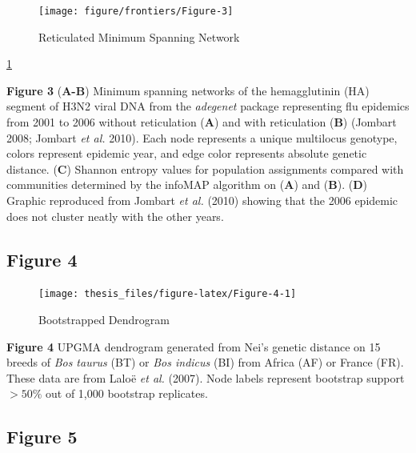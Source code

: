 \documentclass[double,12pt]{beavtex}
\begin{document}
  \begin{figure}
  
  {\centering \texttt{[image: figure/frontiers/Figure-3]} 
  
  }
  
  \caption[Reticulated Minimum Spanning Network]{Reticulated Minimum Spanning Network}\label{fig:Figure-3}
  \end{figure}
  
  \ref{fig:Figure-3}
  
  \textbf{Figure 3} (\textbf{A-B}) Minimum spanning networks of the
  hemagglutinin (HA) segment of H3N2 viral DNA from the \emph{adegenet}
  package representing flu epidemics from 2001 to 2006 without
  reticulation (\textbf{A}) and with reticulation (\textbf{B}) (Jombart
  2008; Jombart \emph{et al.} 2010). Each node represents a unique
  multilocus genotype, colors represent epidemic year, and edge color
  represents absolute genetic distance. (\textbf{C}) Shannon entropy
  values for population assignments compared with communities determined
  by the infoMAP algorithm on (\textbf{A}) and (\textbf{B}). (\textbf{D})
  Graphic reproduced from Jombart \emph{et al.} (2010) showing that the
  2006 epidemic does not cluster neatly with the other years.
  
  \newpage
  
  \subsection{Figure 4}\label{figure-4}
  
  \begin{figure}
  
  {\centering \texttt{[image: thesis\_files/figure-latex/Figure-4-1]} 
  
  }
  
  \caption[Bootstrapped Dendrogram]{Bootstrapped Dendrogram}\label{fig:Figure-4}
  \end{figure}
  
  \textbf{Figure 4} UPGMA dendrogram generated from Nei's genetic distance
  on 15 breeds of \emph{Bos taurus} (BT) or \emph{Bos indicus} (BI) from
  Africa (AF) or France (FR). These data are from Laloë \emph{et al.}
  (2007). Node labels represent bootstrap support \(>50\%\) out of 1,000
  bootstrap replicates.
  
  \newpage
  
  \subsection{Figure 5}\label{figure-5}
  
\end{document}
